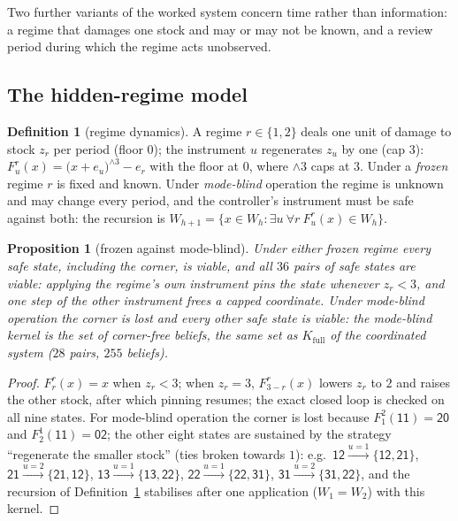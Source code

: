 \documentclass[11pt,a4paper]{article}
\theoremstyle{plain}
\newtheorem{proposition}[theorem]{Proposition}
\theoremstyle{definition}
\newtheorem{definition}[theorem]{Definition}
\theoremstyle{remark}
\newcommand{\st}[1]{\mathsf{#1}}
\newcommand{\Kfull}{K_{\mathrm{full}}}
\begin{document}
Two further variants of the worked system concern time rather than information: a regime that damages one stock and may or may not be known, and a review period during which the regime acts unobserved.

\subsection{The hidden-regime model}

\begin{definition}[regime dynamics]\label{def:regime}
A regime $r\in\{1,2\}$ deals one unit of damage to stock $z_r$ per period (floor $0$); the instrument $u$ regenerates $z_u$ by one (cap $3$):
$F^{r}_u(x)=\bigl(x+e_u\bigr)^{\wedge 3}-e_r$ with the floor at $0$, where $\wedge 3$ caps at $3$. Under a \emph{frozen} regime $r$ is fixed and known. Under \emph{mode-blind} operation the regime is unknown and may change every period, and the controller's instrument must be safe against both: the recursion is $W_{h+1}=\{x\in W_h:\exists u\ \forall r\ F^{r}_u(x)\in W_h\}$.
\end{definition}

\begin{proposition}[frozen against mode-blind]\label{prop:regime}
Under either frozen regime every safe state, including the corner, is viable, and all $36$ pairs of safe states are viable: applying the regime's own instrument pins the state whenever $z_r<3$, and one step of the other instrument frees a capped coordinate. Under mode-blind operation the corner is lost and every other safe state is viable: the mode-blind kernel is the set of corner-free beliefs, the same set as $\Kfull$ of the coordinated system ($28$ pairs, $255$ beliefs).
\end{proposition}

\begin{proof}
$F^{r}_r(x)=x$ when $z_r<3$; when $z_r=3$, $F^{r}_{3-r}(x)$ lowers $z_r$ to $2$ and raises the other stock, after which pinning resumes; the exact closed loop is checked on all nine states. For mode-blind operation the corner is lost because $F^{2}_1(\st{11})=\st{20}$ and $F^{1}_2(\st{11})=\st{02}$; the other eight states are sustained by the strategy ``regenerate the smaller stock'' (ties broken towards $1$): e.g.\ $\st{12}\xrightarrow{u=1}\{\st{12},\st{21}\}$, $\st{21}\xrightarrow{u=2}\{\st{21},\st{12}\}$, $\st{13}\xrightarrow{u=1}\{\st{13},\st{22}\}$, $\st{22}\xrightarrow{u=1}\{\st{22},\st{31}\}$, $\st{31}\xrightarrow{u=2}\{\st{31},\st{22}\}$, and the recursion of Definition~\ref{def:regime} stabilises after one application ($W_1=W_2$) with this kernel.
\end{proof}
\end{document}
